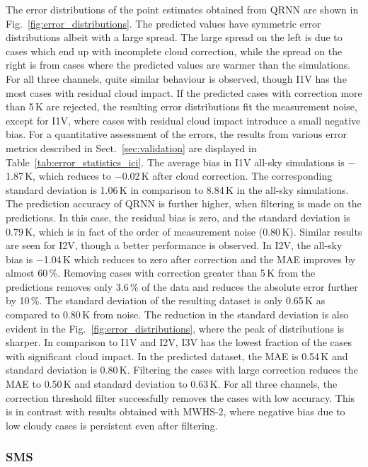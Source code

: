 \documentclass[amt, manuscript]{copernicus}
\begin{document}
The error distributions of the point estimates obtained from QRNN are shown in Fig.~\ref{fig:error_distributions}. The predicted values have symmetric error distributions albeit with a large spread. The large spread on the left is due to cases which end up with incomplete cloud correction, while the spread on the right is from cases where the predicted values are warmer than the simulations. For all three channels, quite similar behaviour is observed, though I1V has the most cases with residual cloud impact. If the predicted cases with correction more than 5\,K are rejected, the resulting error distributions fit the measurement noise, except for I1V, where cases with residual cloud impact introduce a small negative bias. For a quantitative assessment of the errors, the results from various error metrics described in  Sect.~\ref{sec:validation} are displayed in Table~\ref{tab:error_statistics_ici}. The average bias in I1V all-sky simulations is $-$1.87\,K, which reduces to $-$0.02\,K after cloud correction. The corresponding standard deviation is 1.06\,K in comparison to 8.84\,K in the all-sky simulations. The prediction accuracy of QRNN is further higher, when filtering is made on the predictions. In this case, the residual bias is zero, and the standard deviation is 0.79\,K, which is in fact of the order of measurement noise (0.80\,K). Similar results are seen for I2V, though a better performance is observed. In I2V, the all-sky bias is $-$1.04\,K which reduces to zero after correction and the MAE improves by almost 60\,\%. Removing cases with correction greater than 5\,K from the predictions removes only 3.6\,\% of the data and reduces the absolute error further by 10\,\%. The standard deviation of the resulting dataset is only 0.65\,K as compared to 0.80\,K from noise. The reduction in the standard deviation is also evident in the Fig.~\ref{fig:error_distributions}, where the peak of distributions is sharper. In comparison to I1V and I2V, I3V has the lowest fraction of the cases with significant cloud impact. In the predicted dataset, the MAE is 0.54\,K  and standard deviation is 0.80\,K. Filtering the cases with large correction reduces the MAE to 0.50\,K and standard deviation to 0.63\,K.  For all three channels, the correction threshold filter successfully removes the cases with low accuracy. This is in contrast with results obtained with MWHS-2, where negative bias due to low cloudy cases is persistent even after filtering. 


\subsubsection{SMS}
\end{document}
